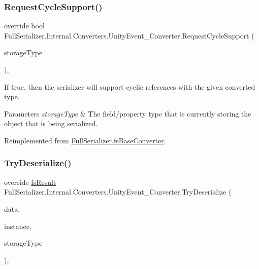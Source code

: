\subsubsection{\texorpdfstring{Request\+Cycle\+Support()}{RequestCycleSupport()}}
{\footnotesize\ttfamily override bool Full\+Serializer.\+Internal.\+Converters.\+Unity\+Event\+\_\+\+Converter.\+Request\+Cycle\+Support (\begin{DoxyParamCaption}\item[{Type}]{storage\+Type }\end{DoxyParamCaption})\hspace{0.3cm}{\ttfamily [inline]}, {\ttfamily [virtual]}}



If true, then the serializer will support cyclic references with the given converted type. 


\begin{DoxyParams}{Parameters}
{\em storage\+Type} & The field/property type that is currently storing the object that is being serialized.\\
\hline
\end{DoxyParams}


Reimplemented from \hyperlink{class_full_serializer_1_1fs_base_converter_a4e850ab88cea1b89771c00e0b65febcd}{Full\+Serializer.\+fs\+Base\+Converter}.

\mbox{\label{class_full_serializer_1_1_internal_1_1_converters_1_1_unity_event___converter_acad9c1e7e271c7ab3d0821c86fb12580}} 
\subsubsection{\texorpdfstring{Try\+Deserialize()}{TryDeserialize()}}
{\footnotesize\ttfamily override \hyperlink{struct_full_serializer_1_1fs_result}{fs\+Result} Full\+Serializer.\+Internal.\+Converters.\+Unity\+Event\+\_\+\+Converter.\+Try\+Deserialize (\begin{DoxyParamCaption}\item[{\hyperlink{class_full_serializer_1_1fs_data}{fs\+Data}}]{data,  }\item[{ref object}]{instance,  }\item[{Type}]{storage\+Type }\end{DoxyParamCaption})\hspace{0.3cm}{\ttfamily [inline]}, {\ttfamily [virtual]}}



